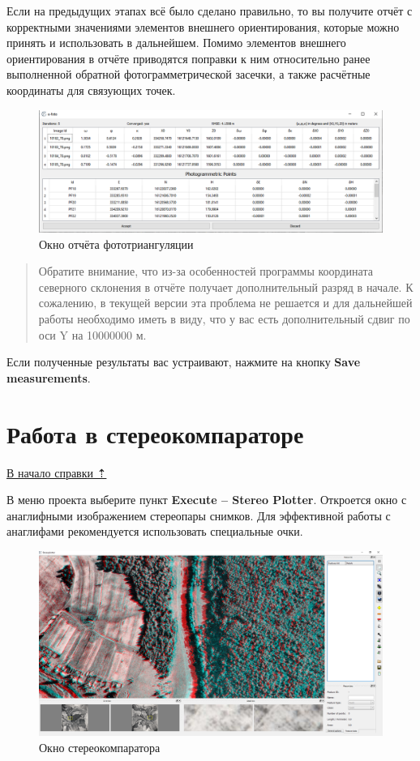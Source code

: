 \documentclass[
  12pt,
]{book}
\begin{document}
Если на предыдущих этапах всё было сделано правильно, то вы получите отчёт с корректными значениями элементов внешнего ориентирования, которые можно принять и использовать в дальнейшем. Помимо элементов внешнего ориентирования в отчёте приводятся поправки к ним относительно ранее выполненной обратной фотограмметрической засечки, а также расчётные координаты для связующих точек.

\begin{figure}
\centering
\includegraphics{images/Ref13/Phototriangulation_report.png}
\caption{Окно отчёта фототриангуляции}
\end{figure}

\begin{quote}
Обратите внимание, что из-за особенностей программы координата северного склонения в отчёте получает дополнительный разряд в начале. К сожалению, в текущей версии эта проблема не решается и для дальнейшей работы необходимо иметь в виду, что у вас есть дополнительный сдвиг по оси Y на 10000000 м.
\end{quote}

Если полученные результаты вас устраивают, нажмите на кнопку \textbf{Save measurements}.

\hypertarget{stereo-stereoplotter}{%
\section{Работа в стереокомпараторе}\label{stereo-stereoplotter}}

\protect\hyperlink{stereo}{В начало справки ⇡}

В меню проекта выберите пункт \textbf{Execute -- Stereo Plotter}. Откроется окно с анаглифными изображением стереопары снимков. Для эффективной работы с анаглифами рекомендуется использовать специальные очки.

\begin{figure}
\centering
\includegraphics{images/Ref13/Stereoplotter.png}
\caption{Окно стереокомпаратора}
\end{figure}
\end{document}
